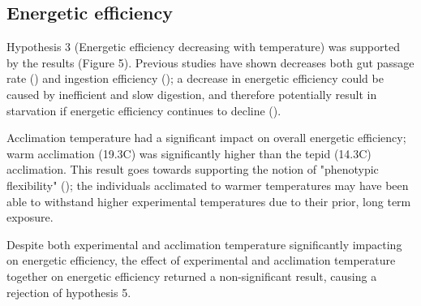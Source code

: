 \documentclass[../../Paper.tex]{subfiles}
\begin{document}
\subsection*{Energetic efficiency}

Hypothesis 3 (Energetic efficiency decreasing with temperature) was supported by the results (Figure 5). Previous 
studies have shown decreases both gut passage rate (\cite{mcconnachie_in_2004}) and ingestion efficiency 
(\cite{rall_temperature_2010}); a decrease in energetic efficiency could be caused by inefficient and slow digestion,
and therefore potentially result in starvation if energetic efficiency continues to decline (\cite{rall_temperature_2010,sentis_using_2012}). 

Acclimation temperature had a significant impact on overall energetic efficiency; warm acclimation (19.3\degree C)
was significantly higher than the tepid (14.3\degree C) acclimation. This result goes towards supporting the notion of "phenotypic 
flexibility" (\cite{piersma_phenotypic_2003,ahlgren_camouflaged_2013}); the individuals acclimated to warmer temperatures
may have been able to withstand higher experimental temperatures due to their prior, long term exposure. 

Despite both experimental and acclimation temperature significantly impacting on energetic efficiency, the effect
of experimental and acclimation temperature together on energetic efficiency returned a non-significant result,
causing a rejection of hypothesis 5. 
\end{document}
